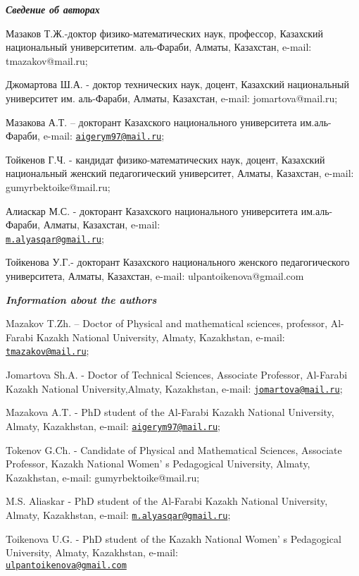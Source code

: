 \begin{authorinfo}
\hspace{1em}\emph{{\bfseries Сведение об авторах}}

Мазаков Т.Ж.-доктор физико-математических наук, профессор, Казахский
национальный университетим. аль-Фараби, Алматы, Казахстан, e-mail:
tmazakov@mail.ru;

Джомартова Ш.А. - доктор технических наук, доцент, Казахский
национальный университет им. аль-Фараби, Алматы, Казахстан, e-mail:
jomartova@mail.ru;

Мазакова А.Т. -- докторант Казахского национального университета
им.аль-Фараби, e-mail:
\href{mailto:aigerym97@mail.ru}{\nolinkurl{aigerym97@mail.ru}};

Тойкенов Г.Ч. - кандидат физико-математических наук, доцент, Казахский
национальный женский педагогический университет, Алматы, Казахстан,
e-mail: gumyrbektoike@mail.ru;

Алиаскар М.С. - докторант Казахского национального университета
им.аль-Фараби, Алматы, Казахстан, e-mail:\\ \href{mailto:m.alyasqar@gmail.ru}{\nolinkurl{m.alyasqar@gmail.ru}};

Тойкенова У.Г.- докторант Казахского национального женского
педагогического университета, Алматы, Казахстан, e-mail:
ulpantoikenova@gmail.com

\hspace{1em}\emph{{\bfseries Information about the authors}}

Mazakov T.Zh. -- Doctor of Physical and mathematical sciences,
professor, Al-Farabi Kazakh National University, Almaty, Kazakhstan,
e-mail: \href{mailto:tmazakov@mail.ru}{\nolinkurl{tmazakov@mail.ru}};

Jomartova Sh.A. - Doctor of Technical Sciences, Associate Professor,
Al-Farabi Kazakh National University,Almaty, Kazakhstan, e-mail:
\href{mailto:jomartova@mail.ru}{\nolinkurl{jomartova@mail.ru}};

Mazakova A.T. - PhD student of the Al-Farabi Kazakh National University,
Almaty, Kazakhstan, e-mail:
\href{mailto:aigerym97@mail.ru}{\nolinkurl{aigerym97@mail.ru}};

Tokenov G.Ch. - Candidate of Physical and Mathematical Sciences,
Associate Professor, Kazakh National Women' s Pedagogical
University, Almaty, Kazakhstan, e-mail: gumyrbektoike@mail.ru;

M.S. Aliaskar - PhD student of the Al-Farabi Kazakh National University,
Almaty, Kazakhstan, e-mail:
\href{mailto:m.alyasqar@gmail.ru}{\nolinkurl{m.alyasqar@gmail.ru}};

Toikenova U.G. - PhD student of the Kazakh National
Women' s Pedagogical University, Almaty, Kazakhstan,
e-mail: \\\href{mailto:ulpantoikenova@gmail.com}{\nolinkurl{ulpantoikenova@gmail.com}}
\end{authorinfo}
